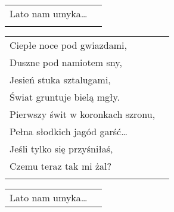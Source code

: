 \documentclass[a5paper]{article}
\begin{document}
\noindent
\begin{tabular}{@{}p{7.50cm}p{3cm}@{}}
Lato nam umyka… \\ \\
\end{tabular}

\noindent
\begin{tabular}{@{}p{7.50cm}p{3cm}@{}}
Ciepłe noce pod gwiazdami, \\
Duszne pod namiotem sny, \\
Jesień stuka sztalugami, \\
Świat gruntuje bielą mgły. \\
Pierwszy świt w koronkach szronu, \\
Pełna słodkich jagód garść… \\
Jeśli tylko się przyśniłaś, \\
Czemu teraz tak mi żal? \\ \\
\end{tabular}

\noindent
\begin{tabular}{@{}p{7.50cm}p{3cm}@{}}
Lato nam umyka… \\
\end{tabular}
\end{document}
